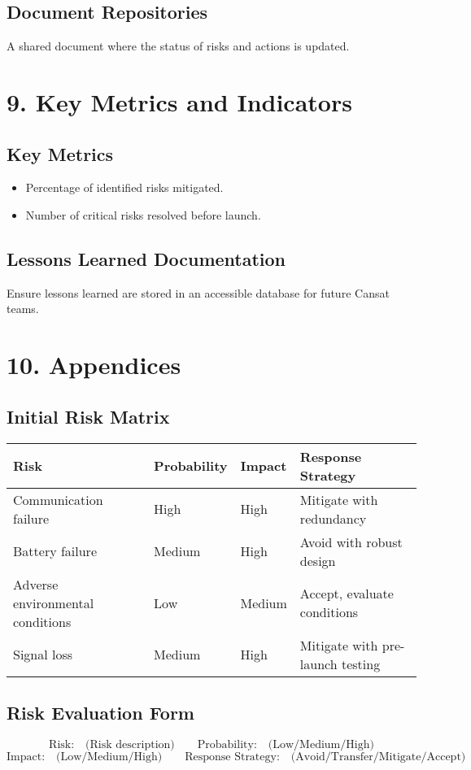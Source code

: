 \documentclass{article}
\begin{document}
\subsection*{Document Repositories}
A shared document where the status of risks and actions is updated.

\section*{9. Key Metrics and Indicators}

\subsection*{Key Metrics}
\begin{itemize}
    \item Percentage of identified risks mitigated.
    \item Number of critical risks resolved before launch.
\end{itemize}

\subsection*{Lessons Learned Documentation}
Ensure lessons learned are stored in an accessible database for future Cansat teams.

\section*{10. Appendices}

\subsection*{Initial Risk Matrix}
\begin{longtable}{|l|l|l|l|}
    \hline
    \textbf{Risk} & \textbf{Probability} & \textbf{Impact} & \textbf{Response Strategy} \\
    \hline
    \endfirsthead
    \hline
    \endfoot
    Communication failure & High & High & Mitigate with redundancy \\
    Battery failure & Medium & High & Avoid with robust design \\
    Adverse environmental conditions & Low & Medium & Accept, evaluate conditions \\
    Signal loss & Medium & High & Mitigate with pre-launch testing \\
\end{longtable}

\subsection*{Risk Evaluation Form}
\[
\text{Risk:} \quad \text{(Risk description)} \quad \quad \text{Probability:} \quad \text{(Low/Medium/High)}
\]
\[
\text{Impact:} \quad \text{(Low/Medium/High)} \quad \quad \text{Response Strategy:} \quad \text{(Avoid/Transfer/Mitigate/Accept)}
\]
\end{document}
